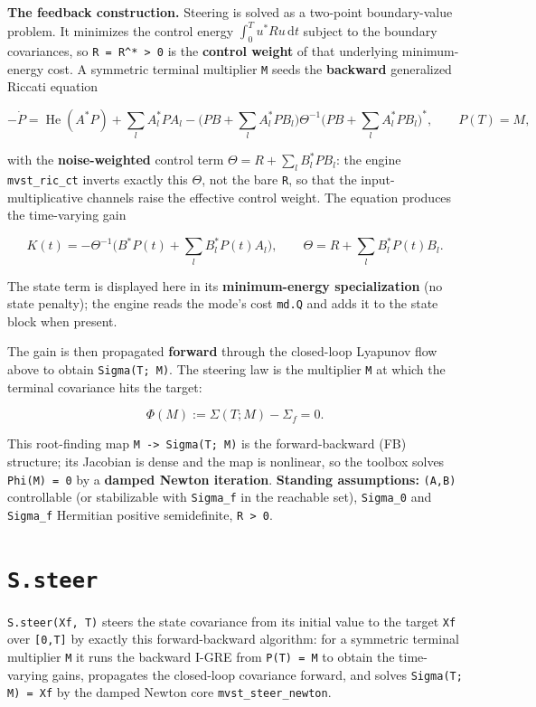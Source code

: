 \documentclass[11pt,oneside]{report}
\newcommand{\code}[1]{\texttt{#1}}
\begin{document}
\textbf{The feedback construction.} Steering is solved as a two-point boundary-value
problem. It minimizes the control energy \(\int_0^T u^{*} R u\,\mathrm{d}t\)
subject to the boundary covariances, so \code{R = R\^{}* \textgreater{} 0} is the \textbf{control weight}
of that underlying minimum-energy cost. A symmetric terminal multiplier \code{M} seeds
the \textbf{backward} generalized Riccati equation

\[
-\dot P = \operatorname{He}(A^{*}P) + \sum_l A_l^{*} P A_l
   - \big(P B + \textstyle\sum_l A_l^{*}P B_l\big) \Theta^{-1} 
     \big(P B + \textstyle\sum_l A_l^{*}P B_l\big)^{*} ,
\qquad P(T) = M ,
\]

with the \textbf{noise-weighted} control term
\(\Theta = R + \sum_l B_l^{*} P B_l\): the engine \code{mvst\_ric\_ct} inverts exactly
this \(\Theta\), not the bare \code{R}, so that the input-multiplicative channels raise
the effective control weight. The equation produces the time-varying gain

\[
K(t) = -\Theta^{-1}\big(B^{*}P(t) + \textstyle\sum_l B_l^{*}P(t)A_l\big) ,
\qquad
\Theta = R + \textstyle\sum_l B_l^{*}P(t)B_l .
\]

The state term is displayed here in its \textbf{minimum-energy specialization} (no
state penalty); the engine reads the mode's cost \code{md.Q} and adds it to the state
block when present.

The gain is then propagated \textbf{forward} through the closed-loop Lyapunov flow
above to obtain \code{Sigma(T; M)}. The steering law is the multiplier \code{M} at which
the terminal covariance hits the target:

\[
\Phi(M) := \Sigma(T; M) - \Sigma_f = 0 .
\]

This root-finding map \code{M -\textgreater{} Sigma(T; M)} is the forward-backward (FB) structure;
its Jacobian is dense and the map is nonlinear, so the toolbox solves
\code{Phi(M) = 0} by a \textbf{damped Newton iteration}. \textbf{Standing assumptions:} \code{(A,B)}
controllable (or stabilizable with \code{Sigma\_f} in the reachable set), \code{Sigma\_0}
and \code{Sigma\_f} Hermitian positive semidefinite, \code{R \textgreater{} 0}.

\hypertarget{s.steer}{%
\section{\texorpdfstring{\code{S.steer}}{S.steer}}\label{s.steer}}

\code{S.steer(Xf, T)} steers the state covariance from its initial value to the
target \code{Xf} over \code{[0,T]} by exactly this forward-backward algorithm: for a
symmetric terminal multiplier \code{M} it runs the backward I-GRE from \code{P(T) = M} to
obtain the time-varying gains, propagates the closed-loop covariance forward,
and solves \code{Sigma(T; M) = Xf} by the damped Newton core \code{mvst\_steer\_newton}.
\end{document}
